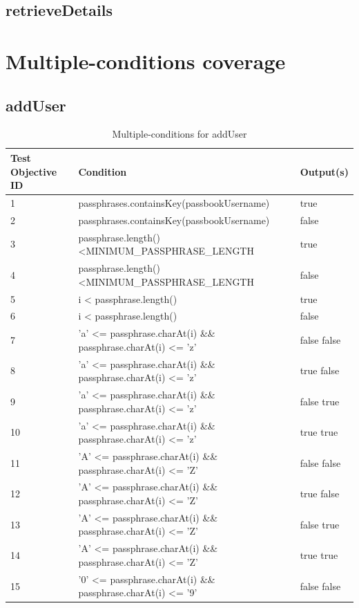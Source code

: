 \documentclass{article}
\begin{document}
\subsection{retrieveDetails}

\section{Multiple-conditions coverage}
\subsection{addUser}
\begin{longtable}{|p{2cm}|p{10cm}|p{3cm}|}
\caption{Multiple-conditions for addUser}\\
\hline 
Test Objective ID&Condition&Output(s)\\
\hline  
1&passphrases.containsKey(passbookUsername)&true\\
\hline
2&passphrases.containsKey(passbookUsername)&false\\
\hline
3&passphrase.length() \textless MINIMUM\_PASSPHRASE\_LENGTH&true\\
\hline
4&passphrase.length() \textless MINIMUM\_PASSPHRASE\_LENGTH&false\\
\hline
5&i < passphrase.length()&true\\
\hline
6&i < passphrase.length()&false\\
\hline
7&'a' <= passphrase.charAt(i) \&\& passphrase.charAt(i) <= 'z'&false false\\
\hline
8&'a' <= passphrase.charAt(i) \&\& passphrase.charAt(i) <= 'z'&true false\\
\hline
9&'a' <= passphrase.charAt(i) \&\& passphrase.charAt(i) <= 'z'&false true\\
\hline
10&'a' <= passphrase.charAt(i) \&\& passphrase.charAt(i) <= 'z'&true true\\
\hline
11&'A' <= passphrase.charAt(i) \&\& passphrase.charAt(i) <= 'Z'&false false\\
\hline
12&'A' <= passphrase.charAt(i) \&\& passphrase.charAt(i) <= 'Z'&true false\\
\hline
13&'A' <= passphrase.charAt(i) \&\& passphrase.charAt(i) <= 'Z'&false true\\
\hline
14&'A' <= passphrase.charAt(i) \&\& passphrase.charAt(i) <= 'Z'&true true\\
\hline
15&'0' <= passphrase.charAt(i) \&\& passphrase.charAt(i) <= '9'&false false\\

\end{longtable}
\end{document}
